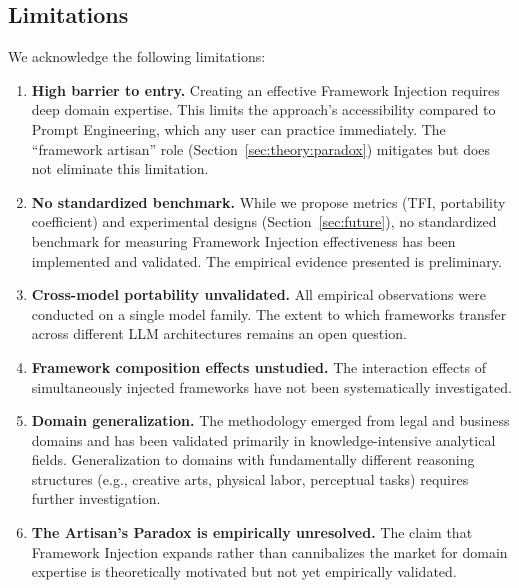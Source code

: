 \documentclass[12pt,a4paper]{article}
\begin{document}
\subsection{Limitations}
\label{sec:contributions:limits}

We acknowledge the following limitations:

\begin{enumerate}
    \item \textbf{High barrier to entry.} Creating an effective Framework Injection requires deep domain expertise. This limits the approach's accessibility compared to Prompt Engineering, which any user can practice immediately. The ``framework artisan'' role (Section~\ref{sec:theory:paradox}) mitigates but does not eliminate this limitation.

    \item \textbf{No standardized benchmark.} While we propose metrics (TFI, portability coefficient) and experimental designs (Section~\ref{sec:future}), no standardized benchmark for measuring Framework Injection effectiveness has been implemented and validated. The empirical evidence presented is preliminary.

    \item \textbf{Cross-model portability unvalidated.} All empirical observations were conducted on a single model family. The extent to which frameworks transfer across different LLM architectures remains an open question.

    \item \textbf{Framework composition effects unstudied.} The interaction effects of simultaneously injected frameworks have not been systematically investigated.

    \item \textbf{Domain generalization.} The methodology emerged from legal and business domains and has been validated primarily in knowledge-intensive analytical fields. Generalization to domains with fundamentally different reasoning structures (e.g., creative arts, physical labor, perceptual tasks) requires further investigation.

    \item \textbf{The Artisan's Paradox is empirically unresolved.} The claim that Framework Injection expands rather than cannibalizes the market for domain expertise is theoretically motivated but not yet empirically validated.
\end{enumerate}


\end{document}
